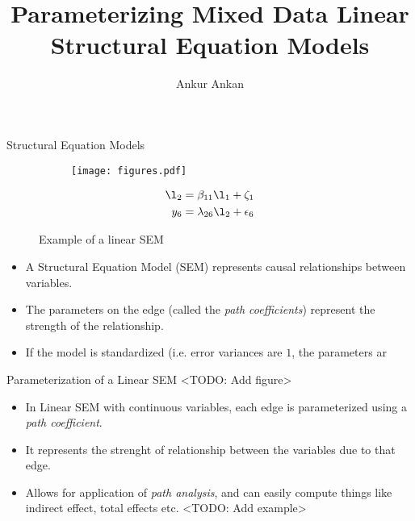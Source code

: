 \documentclass{beamer}
\begin{document}
\title[]{Parameterizing Mixed Data Linear Structural Equation Models}
\author{Ankur Ankan}
\date{}

\maketitle

\begin{frame}{Structural Equation Models}
	\begin{figure}
		\centering
		\begin{subfigure}{0.6 \textwidth}
			\centering
			\texttt{[image: figures.pdf]}
		\end{subfigure}%
		\begin{subfigure}{0.4 \textwidth}
			\centering
			\begin{equation*}
				\begin{split}
					\l_2 &= \beta_{11} \l_1 + \zeta_1 \\
					y_6 &= \lambda_{26} \l_2 + \epsilon_6 \\
				\end{split}
			\end{equation*}
		\end{subfigure}	
		\caption{Example of a linear SEM }
	\end{figure}

	\begin{itemize}
		\item A Structural Equation Model (SEM) represents causal relationships between variables.
		\item The parameters on the edge (called the \emph{path
			coefficients}) represent the strength of the
			relationship.
		\item If the model is standardized (i.e. error variances are $ 1 $, the parameters ar
	\end{itemize}
\end{frame}

\begin{frame}{Parameterization of a Linear SEM}
	<TODO: Add figure>
	\begin{itemize}
		\item In Linear SEM with continuous variables, each edge is parameterized
			using a \emph{path coefficient}.
		\item It represents the strenght of relationship between the variables
			due to that edge.
		\item Allows for application of \emph{path analysis}, and can easily
			compute things like indirect effect, total effects etc.
			<TODO: Add example>
	\end{itemize}
\end{frame}
\end{document}
